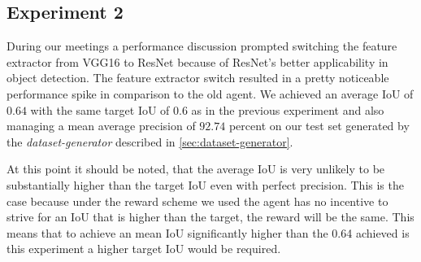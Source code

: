 \subsection{Experiment 2}
During our meetings a performance discussion prompted switching the feature extractor from VGG16\cite{VGG16} to ResNet\cite{ResNet} because of ResNet's better applicability in object detection.
The feature extractor switch resulted in a pretty noticeable performance spike in comparison to the old agent.
We achieved an average IoU of $0.64$ with the same target IoU of $0.6$ as in the previous experiment and also managing a mean average precision of $92.74$ percent on our test set generated by the \textit{dataset-generator} described in \ref{sec:dataset-generator}. 

At this point it should be noted, that the average IoU is very unlikely to be substantially higher than the target IoU even with perfect precision. This is the case because under the reward scheme we used the agent has no incentive to strive for an IoU that is higher than the target, the reward will be the same. This means that to achieve an mean IoU significantly higher than the 0.64 achieved is this experiment a higher target IoU would be required.